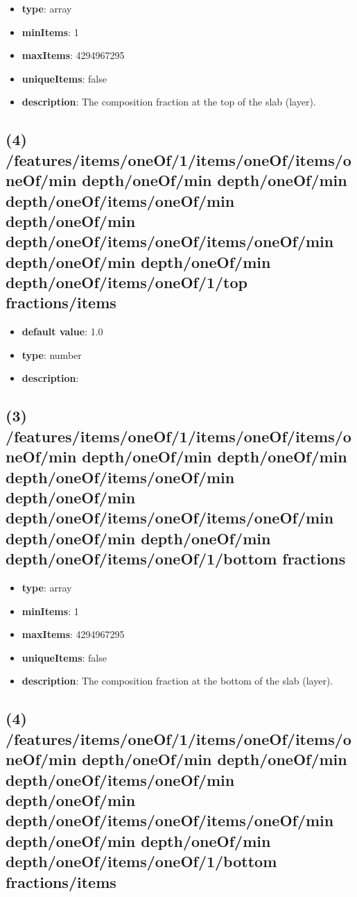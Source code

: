 \begin{itemize}[leftmargin=3em]\item {\bf type}: array
\item {\bf minItems}: 1
\item {\bf maxItems}: 4294967295
\item {\bf uniqueItems}: false
\item {\bf description}: The composition fraction at the top of the slab (layer).
\end{itemize}\subsection{(4) /features/items/oneOf/1/items/oneOf/items/oneOf/min depth/oneOf/min depth/oneOf/min depth/oneOf/items/oneOf/min depth/oneOf/min depth/oneOf/items/oneOf/items/oneOf/min depth/oneOf/min depth/oneOf/min depth/oneOf/items/oneOf/1/top fractions/items}
\begin{itemize}[leftmargin=4em]\item {\bf default value}: 1.0
\item {\bf type}: number
\item {\bf description}: 
\end{itemize}\subsection{(3) /features/items/oneOf/1/items/oneOf/items/oneOf/min depth/oneOf/min depth/oneOf/min depth/oneOf/items/oneOf/min depth/oneOf/min depth/oneOf/items/oneOf/items/oneOf/min depth/oneOf/min depth/oneOf/min depth/oneOf/items/oneOf/1/bottom fractions}
\begin{itemize}[leftmargin=3em]\item {\bf type}: array
\item {\bf minItems}: 1
\item {\bf maxItems}: 4294967295
\item {\bf uniqueItems}: false
\item {\bf description}: The composition fraction at the bottom of the slab (layer).
\end{itemize}\subsection{(4) /features/items/oneOf/1/items/oneOf/items/oneOf/min depth/oneOf/min depth/oneOf/min depth/oneOf/items/oneOf/min depth/oneOf/min depth/oneOf/items/oneOf/items/oneOf/min depth/oneOf/min depth/oneOf/min depth/oneOf/items/oneOf/1/bottom fractions/items}
